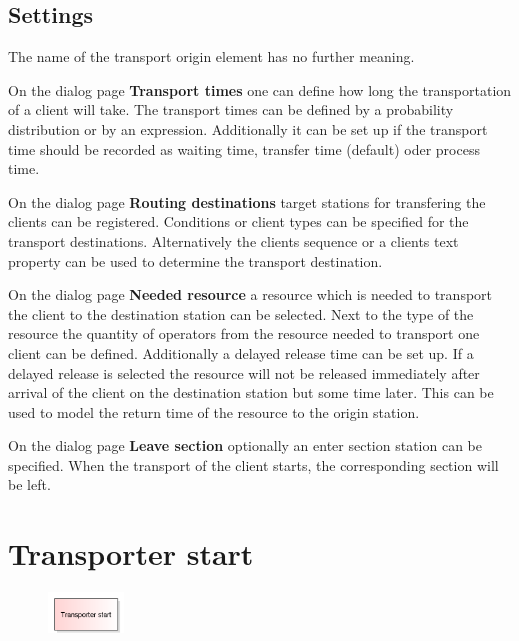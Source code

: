 \subsection*{Settings}

The name of the transport origin element has no further meaning.

On the dialog page \textbf{Transport times} one can define how long the transportation
of a client will take. The transport times can be defined by a probability distribution
or by an expression. Additionally it can be set up if the transport time should be recorded
as waiting time, transfer time (default) oder process time.

On the dialog page \textbf{Routing destinations} target stations for transfering the
clients can be registered. Conditions or client types can be specified for the transport
destinations. Alternatively the clients sequence or a clients text property can be used to determine
the transport destination.

On the dialog page \textbf{Needed resource} a resource which is needed to transport
the client to the destination station can be selected. Next to the type of the
resource the quantity of operators from the resource needed to transport one
client can be defined. Additionally a delayed release time can be set up.
If a delayed release is selected the resource will not be released immediately
after arrival of the client on the destination station but some time later.
This can be used to model the return time of the resource to the origin
station.

On the dialog page \textbf{Leave section} optionally an enter section station can be specified.
When the transport of the client starts, the corresponding section will be left.


\section{Transporter start}
\label{ref:ModelElementTransportTransporterSource}

\begin{figure}
\vspace{-22pt}
\includegraphics[width=2cm]{imageModelElementTransportTransporterSource.png}
\vspace{-22pt}
\end{figure}

